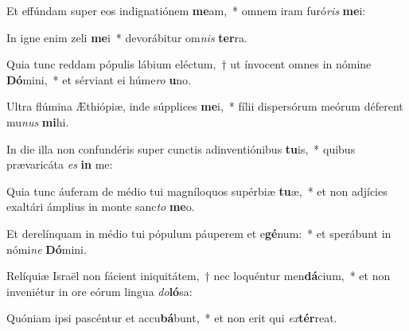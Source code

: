 \item Et effúndam super eos indignatiónem \textbf{me}am,~* omnem iram furó\textit{ris} \textbf{me}i:
\item In igne enim zeli \textbf{me}i~* devorábitur om\textit{nis} \textbf{ter}ra.
\item Quia tunc reddam pópulis lábium eléctum,~† ut ínvocent omnes in nómine \textbf{Dó}mini,~* et sérviant ei húme\textit{ro} \textbf{u}no.
\item Ultra flúmina Æthiópiæ, inde súpplices \textbf{me}i,~* fílii dispersórum meórum déferent mu\textit{nus} \textbf{mi}hi.
\item In die illa non confundéris super cunctis adinventiónibus \textbf{tu}is,~* quibus prævaricáta \textit{es} \textbf{in} me:
\item Quia tunc áuferam de médio tui magníloquos supérbiæ \textbf{tu}æ,~* et non adjícies exaltári ámplius in monte sanc\textit{to} \textbf{me}o.
\item Et derelínquam in médio tui pópulum páuperem et e\textbf{gé}num:~* et sperábunt in nómi\textit{ne} \textbf{Dó}mini.
\item Relíquiæ Israël non fácient iniquitátem,~† nec loquéntur men\textbf{dá}cium,~* et non inveniétur in ore eórum lingua \textit{do}\textbf{ló}sa:
\item Quóniam ipsi pascéntur et accu\textbf{bá}bunt,~* et non erit qui \textit{ex}\textbf{tér}reat.
